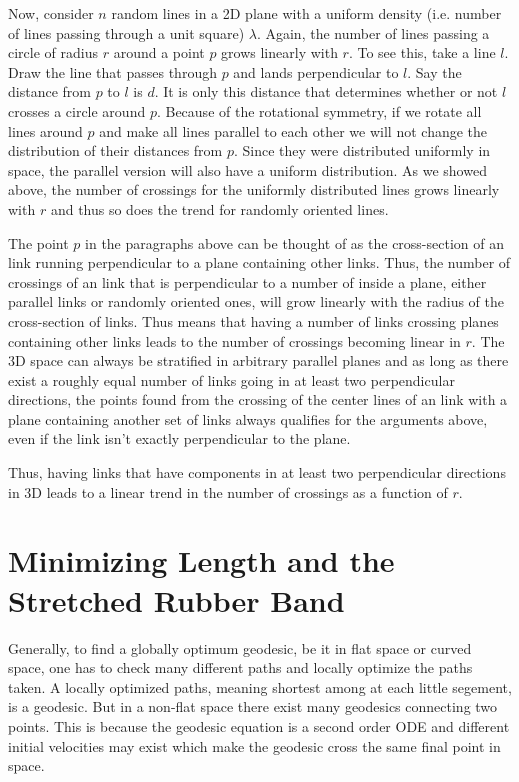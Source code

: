 \documentclass[nofootinbib,preprint,floatfix,titlepage,superscriptaddress]{revtex4} %
\begin{document}
Now, consider $n$ random lines in a 2D plane with a uniform density (i.e. number of lines passing through a unit square) $\lambda$. Again, the number of lines passing a circle of radius $r$ around a point $p$ grows linearly with $r$. To see this, take a line $l$. Draw the line that passes through $p$ and lands perpendicular to $l$. Say the distance from $p$ to $l$ is $d$. It is only this distance that determines whether or not $l$ crosses a circle around $p$. Because of the rotational symmetry, if we rotate all lines around $p$ and make all lines parallel to each other we will not change the distribution of their distances from $p$. Since they were distributed uniformly in space, the parallel version will also have a uniform distribution. As we showed above, the number of crossings for the uniformly distributed lines grows linearly with $r$ and thus so does the trend for randomly oriented lines. 

The point $p$ in the paragraphs above can be thought of as the cross-section of an link running perpendicular to a plane containing other links. Thus, the number of crossings of an link that is perpendicular to a number of inside a plane, either parallel links or randomly oriented ones, will grow linearly with the radius of the cross-section of links. Thus means that having a number of links crossing planes containing other links leads to the number of crossings becoming linear in $r$. The 3D space can always be stratified in arbitrary parallel planes and as long as there exist a roughly equal number of links going in at least two perpendicular directions, the points found from the crossing of the center lines of an link with a plane containing another set of links always qualifies for the arguments above, even if the link isn't exactly perpendicular to the plane. 

Thus, having links that have components in at least two perpendicular directions in 3D leads to a linear trend in the number of crossings as a function of $r$.  



\section{Minimizing Length and the Stretched Rubber Band\label{ap:affine}}
Generally, to find a globally optimum geodesic, be it in flat space or curved space, one has to check many different paths and locally optimize the paths taken. A locally optimized paths, meaning shortest among at each little segement, is a geodesic. But in a non-flat space there exist many geodesics connecting two points. This is because the geodesic equation is a second order ODE and different initial velocities may exist which make the geodesic cross the same final point in space. 
\end{document}

